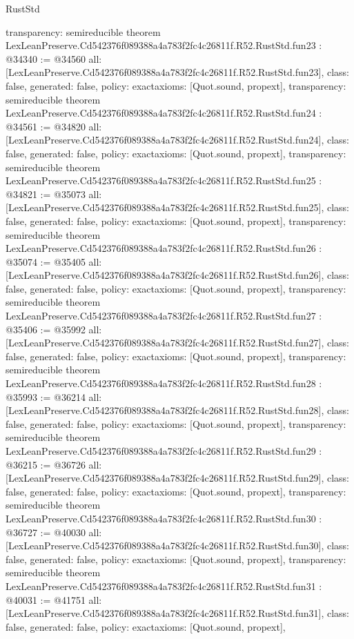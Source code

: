 \begin{lexlean}{RustStd}
\begin{coremodule}
{  transparency: semireducible
}
theorem LexLeanPreserve.Cd542376f089388a4a783f2fc4c26811f.R52.RustStd.fun23 : @34340 := @34560 {
  all: [LexLeanPreserve.Cd542376f089388a4a783f2fc4c26811f.R52.RustStd.fun23],
  class: false,
  generated: false,
  policy: exact{axioms: [Quot.sound, propext]},
  transparency: semireducible
}
theorem LexLeanPreserve.Cd542376f089388a4a783f2fc4c26811f.R52.RustStd.fun24 : @34561 := @34820 {
  all: [LexLeanPreserve.Cd542376f089388a4a783f2fc4c26811f.R52.RustStd.fun24],
  class: false,
  generated: false,
  policy: exact{axioms: [Quot.sound, propext]},
  transparency: semireducible
}
theorem LexLeanPreserve.Cd542376f089388a4a783f2fc4c26811f.R52.RustStd.fun25 : @34821 := @35073 {
  all: [LexLeanPreserve.Cd542376f089388a4a783f2fc4c26811f.R52.RustStd.fun25],
  class: false,
  generated: false,
  policy: exact{axioms: [Quot.sound, propext]},
  transparency: semireducible
}
theorem LexLeanPreserve.Cd542376f089388a4a783f2fc4c26811f.R52.RustStd.fun26 : @35074 := @35405 {
  all: [LexLeanPreserve.Cd542376f089388a4a783f2fc4c26811f.R52.RustStd.fun26],
  class: false,
  generated: false,
  policy: exact{axioms: [Quot.sound, propext]},
  transparency: semireducible
}
theorem LexLeanPreserve.Cd542376f089388a4a783f2fc4c26811f.R52.RustStd.fun27 : @35406 := @35992 {
  all: [LexLeanPreserve.Cd542376f089388a4a783f2fc4c26811f.R52.RustStd.fun27],
  class: false,
  generated: false,
  policy: exact{axioms: [Quot.sound, propext]},
  transparency: semireducible
}
theorem LexLeanPreserve.Cd542376f089388a4a783f2fc4c26811f.R52.RustStd.fun28 : @35993 := @36214 {
  all: [LexLeanPreserve.Cd542376f089388a4a783f2fc4c26811f.R52.RustStd.fun28],
  class: false,
  generated: false,
  policy: exact{axioms: [Quot.sound, propext]},
  transparency: semireducible
}
theorem LexLeanPreserve.Cd542376f089388a4a783f2fc4c26811f.R52.RustStd.fun29 : @36215 := @36726 {
  all: [LexLeanPreserve.Cd542376f089388a4a783f2fc4c26811f.R52.RustStd.fun29],
  class: false,
  generated: false,
  policy: exact{axioms: [Quot.sound, propext]},
  transparency: semireducible
}
theorem LexLeanPreserve.Cd542376f089388a4a783f2fc4c26811f.R52.RustStd.fun30 : @36727 := @40030 {
  all: [LexLeanPreserve.Cd542376f089388a4a783f2fc4c26811f.R52.RustStd.fun30],
  class: false,
  generated: false,
  policy: exact{axioms: [Quot.sound, propext]},
  transparency: semireducible
}
theorem LexLeanPreserve.Cd542376f089388a4a783f2fc4c26811f.R52.RustStd.fun31 : @40031 := @41751 {
  all: [LexLeanPreserve.Cd542376f089388a4a783f2fc4c26811f.R52.RustStd.fun31],
  class: false,
  generated: false,
  policy: exact{axioms: [Quot.sound, propext]},
}
\end{coremodule}
\end{lexlean}
